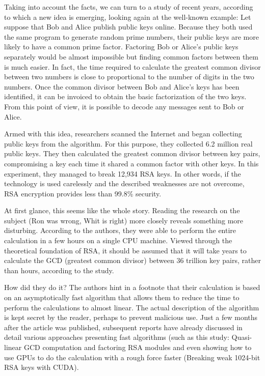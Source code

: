\documentclass[graybox]{svmult}
\begin{document}
Taking into account the facts, we can turn to a study of recent years, according to which a new idea is emerging, looking again at the well-known example: Let suppose that Bob and Alice publish public keys online. Because they both used the same program to generate random prime numbers, their public keys are more likely to have a common prime factor. Factoring Bob or Alice's public keys separately would be almost impossible but finding common factors between them is much easier. In fact, the time required to calculate the greatest common divisor between two numbers is close to proportional to the number of digits in the two numbers. Once the common divisor between Bob and Alice's keys has been identified, it can be invoiced to obtain the basic factorization of the two keys. From this point of view, it is possible to decode any messages sent to Bob or Alice.

Armed with this idea, researchers scanned the Internet and began collecting public keys from the algorithm. For this purpose, they collected 6.2 million real public keys. They then calculated the greatest common divisor between key pairs, compromising a key each time it shared a common factor with other keys. In this experiment, they managed to break 12,934 RSA keys. In other words, if the technology is used carelessly and the described weaknesses are not overcome, RSA encryption provides less than 99.8\% security. 

At first glance, this seems like the whole story. Reading the research on the subject (Ron was wrong, Whit is right) more closely reveals something more disturbing. According to the authors, they were able to perform the entire calculation in a few hours on a single CPU machine. Viewed through the theoretical foundation of RSA, it should be assumed that it will take years to calculate the GCD (greatest common divisor) between 36 trillion key pairs, rather than hours, according to the study.

How did they do it? The authors hint in a footnote that their calculation is based on an asymptotically fast algorithm that allows them to reduce the time to perform the calculations to almost linear. The actual description of the algorithm is kept secret by the reader, perhaps to prevent malicious use. Just a few months after the article was published, subsequent reports have already discussed in detail various approaches presenting fast algorithms (such as this study: Quasi-linear GCD computation and factoring RSA modules and even showing how to use GPUs to do the calculation with a rough force faster (Breaking weak 1024-bit RSA keys with CUDA). 
\end{document}
